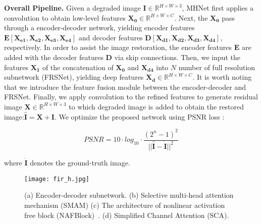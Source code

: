 \documentclass[lettersize,journal]{IEEEtran}
\begin{document}
\noindent\textbf{Overall Pipeline.} Given a degraded image $\mathbf{I} \in \mathbb R^{H \times W \times 3}$, MHNet first applies a convolution to obtain low-level features $\mathbf{X_{0}} \in \mathbb R^{H \times W \times C}$. Next, the $\mathbf{X_{0}}$ pass through a encoder-decoder network, yielding encoder features $\mathbf{E}[\mathbf{X_{e1}}, \mathbf{X_{e2}}, \mathbf{X_{e3}}, \mathbf{X_{e4}}]$ and decoder features $\mathbf{D}[\mathbf{X_{d1}}, \mathbf{X_{d2}}, \mathbf{X_{d3}}, \mathbf{X_{d4}}]$, respectively. In order to assist the image restoration, the encoder features $\mathbf{E}$ are added with the decoder features $\mathbf{D}$ via skip connections. Then, we input the features $\mathbf{X_1}$ of the concatenation of $\mathbf{X_0}$ and $\mathbf{X_{d4}}$ into $N$ number of full resolution  subnetwork (FRSNet), yielding deep features $\mathbf{X_d}\in \mathbb R^{H \times W \times C}$. It is worth noting that we introduce the feature fusion module between the encoder-decoder and FRSNet. Finally, we apply  convolution to the refined features to generate residual image $\mathbf{X}\in \mathbb R^{H \times W \times 3}$ to which degraded image is added to obtain the restored image:$\mathbf{\hat{I}} = \mathbf{X} +\mathbf{I}$. We optimize the proposed network using PSNR loss : 

\begin{equation}
	\label{equ:03}
	PSNR = 10 \cdot log_{10} \cdot \frac{(2^n-1)^2}{||\mathbf{\hat{I}}-\mathbf{\dot I}||^2}
\end{equation}

\noindent where $\mathbf{\dot I}$ denotes the ground-truth image.

\begin{figure*}[!htb] \centering
	\texttt{[image: fir\_h.jpg]}
	\caption{(a) Encoder-decoder subnetwork. (b) Selective multi-head attention mechanism (SMAM) (c) The architecture of nonlinear activation free block (NAFBlock)~\cite{chen2022simple}. (d) Simplified Channel Attention (SCA).
 }

	\label{fig:fir_h}
\end{figure*}
\end{document}
